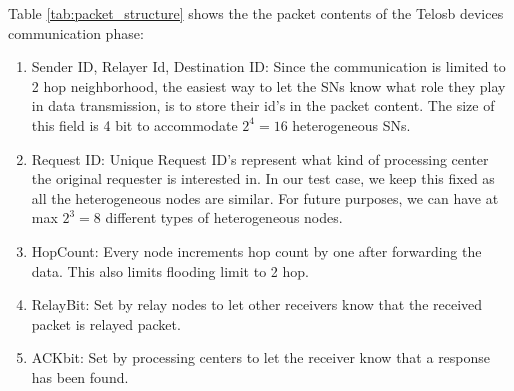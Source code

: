 Table \ref{tab:packet_structure} shows the the packet contents of the Telosb devices communication phase:

\begin{enumerate}
	
	\item Sender ID, Relayer Id, Destination ID: Since the communication is limited to 2 hop neighborhood, the easiest way to let the \acp{SN} know what role they play in data transmission, is to store their id's in the packet content. The size of this field is 4 bit to accommodate $2^4 = 16$ heterogeneous \acp{SN}.
	
	\item Request ID: Unique Request ID's represent what kind of processing center the original requester is interested in. In our test case, we keep this fixed as all the heterogeneous nodes are similar. For future purposes, we can have at max $2^3 = 8$ different types of heterogeneous nodes.
	
	\item HopCount: Every node increments hop count by one after forwarding the data. This also limits flooding limit to 2 hop.
	
	\item RelayBit: Set by relay nodes to let other receivers know that the received packet is relayed packet.
	
	\item ACKbit: Set by processing centers to let the receiver know that a response has been found.
	
\end{enumerate}

